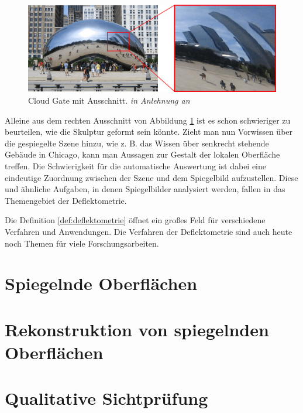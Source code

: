 \begin{figure}[H]
	\centering
	\includegraphics[width=\textwidth]{02_grundlagenDerDeflektometrie/figures/cloudGateMitAusschnitt}
	\caption[Cloud Gate mit Ausschnitt]{Cloud Gate mit Ausschnitt. \textit{in Anlehnung an} \cite{cloudGateChicago}}
	\label{img:cloudGateMitAusschnitt}
\end{figure}

\noindent
Alleine aus dem rechten Ausschnitt von Abbildung \ref{img:cloudGateMitAusschnitt} ist es schon schwieriger zu beurteilen, wie die Skulptur geformt sein könnte.
Zieht man nun Vorwissen über die gespiegelte Szene hinzu, wie z. B. das Wissen über senkrecht stehende Gebäude in Chicago, kann man Aussagen zur Gestalt der lokalen Oberfläche treffen.
Die Schwierigkeit für die automatische Auswertung ist dabei eine eindeutige Zuordnung zwischen der Szene und dem Spiegelbild aufzustellen.
Diese und ähnliche Aufgaben, in denen Spiegelbilder analysiert werden, fallen in das Themengebiet der Deflektometrie.

\p
Die Definition \ref{def:deflektometrie} öffnet ein großes Feld für verschiedene Verfahren und Anwendungen.
Die Verfahren der Deflektometrie sind auch heute noch Themen für viele Forschungsarbeiten.

{
	\FloatBarrier
    \section{Spiegelnde Oberflächen}
    \label{sec:spiegelndeOberflaechen}
    
}

{
	\FloatBarrier
    \section{Rekonstruktion von spiegelnden Oberflächen}
    \label{sec:rekonstruktion}
    
}

{
	\FloatBarrier
    \section{Qualitative Sichtprüfung}
    \label{sec:qualitativeSichtpruefung}
    
}